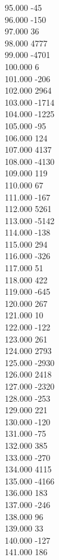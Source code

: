 { 95.000	-45 \\
 96.000	-150 \\
 97.000	36 \\
 98.000	4777 \\
 99.000	-4701 \\
 100.000	6 \\
 101.000	-206 \\
 102.000	2964 \\
 103.000	-1714 \\
 104.000	-1225 \\
 105.000	-95 \\
 106.000	124 \\
 107.000	4137 \\
 108.000	-4130 \\
 109.000	119 \\
 110.000	67 \\
 111.000	-167 \\
 112.000	5261 \\
 113.000	-5142 \\
 114.000	-138 \\
 115.000	294 \\
 116.000	-326 \\
 117.000	51 \\
 118.000	422 \\
 119.000	-645 \\
 120.000	267 \\
 121.000	10 \\
 122.000	-122 \\
 123.000	261 \\
 124.000	2793 \\
 125.000	-2930 \\
 126.000	2418 \\
 127.000	-2320 \\
 128.000	-253 \\
 129.000	221 \\
 130.000	-120 \\
 131.000	-75 \\
 132.000	385 \\
 133.000	-270 \\
 134.000	4115 \\
 135.000	-4166 \\
 136.000	183 \\
 137.000	-246 \\
 138.000	96 \\
 139.000	33 \\
 140.000	-127 \\
 141.000	186 \\
}
